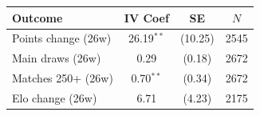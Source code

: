 \begin{tabular}{lccc}
\toprule
Outcome & IV Coef & SE & $N$ \\
\midrule
Points change (26w) & 26.19$^{**}$ & (10.25) & 2545 \\
Main draws (26w) & 0.29 & (0.18) & 2672 \\
Matches 250+ (26w) & 0.70$^{**}$ & (0.34) & 2672 \\
Elo change (26w) & 6.71 & (4.23) & 2175 \\
\bottomrule
\end{tabular}
